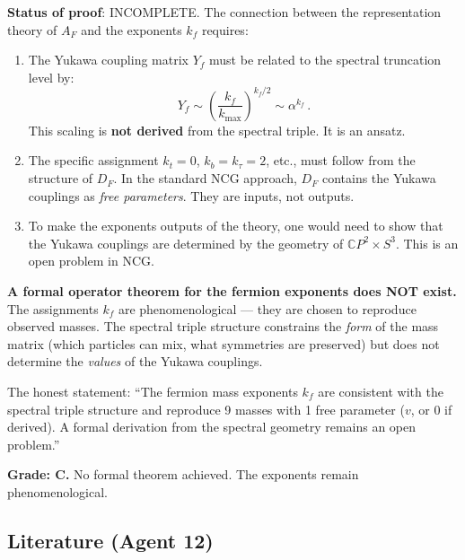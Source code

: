 \documentclass[11pt,a4paper]{article}
\newcommand{\CP}{\mathbb{C}P}
\begin{document}
\textbf{Status of proof}: INCOMPLETE. The connection between the representation theory of $A_F$ and the exponents $k_f$ requires:

\begin{enumerate}
\item The Yukawa coupling matrix $Y_f$ must be related to the spectral truncation level by:
\begin{equation}
Y_f \sim \left(\frac{k_f}{k_{\max}}\right)^{k_f/2} \sim \alpha^{k_f}\,.
\end{equation}
This scaling is \textbf{not derived} from the spectral triple. It is an ansatz.

\item The specific assignment $k_t = 0$, $k_b = k_\tau = 2$, etc., must follow from the structure of $D_F$. In the standard NCG approach, $D_F$ contains the Yukawa couplings as \emph{free parameters}. They are inputs, not outputs.

\item To make the exponents outputs of the theory, one would need to show that the Yukawa couplings are determined by the geometry of $\CP^2 \times S^3$. This is an open problem in NCG.
\end{enumerate}

\begin{tcolorbox}[colback=yellow!5!white, colframe=yellow!60!black, title={Agent 12 Assessment}]
\textbf{A formal operator theorem for the fermion exponents does NOT exist.} The assignments $k_f$ are phenomenological --- they are chosen to reproduce observed masses. The spectral triple structure constrains the \emph{form} of the mass matrix (which particles can mix, what symmetries are preserved) but does not determine the \emph{values} of the Yukawa couplings.

The honest statement: ``The fermion mass exponents $k_f$ are consistent with the spectral triple structure and reproduce 9 masses with 1 free parameter ($v$, or 0 if derived). A formal derivation from the spectral geometry remains an open problem.''
\end{tcolorbox}

\textbf{Grade: C.} No formal theorem achieved. The exponents remain phenomenological.

\subsection{Literature (Agent 12)}
\end{document}
